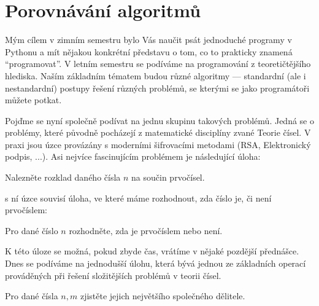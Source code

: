 \ifx\ucebnice\undefined

\setcounter{section}{0}
\else
\renewcommand{\section}[1]{\chapter{#1}}
\fi
\section{Porovnávání algoritmů}

Mým cílem v zimním semestru bylo Vás naučit psát jednoduché programy v Pythonu a mít nějakou konkrétní představu o tom,
co to prakticky znamená ``programovat''. V letním semestru se podíváme na programování z teoretičtějšího hlediska.
Naším základním tématem budou různé algoritmy --- standardní (ale i nestandardní) postupy řešení různých problémů,
se kterými se jako programátoři můžete potkat.

Pojďme se nyní společně podívat na jednu skupinu takových problémů. Jedná se o problémy, které původně pocházejí z
matematické disciplíny zvané Teorie čísel. V praxi jsou úzce provázány s moderními šifrovacími metodami
(RSA, Elektronický podpis, ...). Asi nejvíce fascinujícím problémem je následující úloha:

\begin{uloha}
Nalezněte rozklad daného čísla $n$ na součin prvočísel.
\end{uloha}

s ní úzce souvisí úloha, ve které máme rozhodnout, zda číslo je, či není prvočíslem:

\begin{uloha}
Pro dané číslo $n$ rozhodněte, zda je prvočíslem nebo není.
\end{uloha}

K této úloze se možná, pokud zbyde čas, vrátíme v nějaké pozdější přednášce. Dnes se podíváme na jednodušší úlohu, která
bývá jednou ze základních operací prováděných při řešení složitějších problémů v teorii čísel.

\begin{uloha}
Pro dané čísla $n,m$ zjistěte jejich největšího společného dělitele.
\end{uloha}



